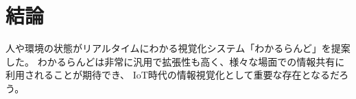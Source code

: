 \section{結論}
人や環境の状態がリアルタイムにわかる視覚化システム「わかるらんど」を提案した。
わかるらんどは非常に汎用で拡張性も高く、様々な場面での情報共有に利用されることが期待でき、
IoT時代の情報視覚化として重要な存在となるだろう。